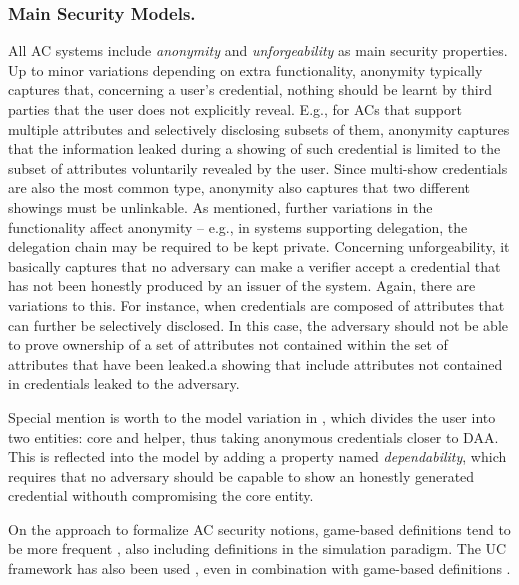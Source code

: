 \subsubsection{Main Security Models.}
%
All AC systems include \emph{anonymity} and \emph{unforgeability} as main
security properties. Up to minor variations depending on extra functionality,
anonymity typically captures that, concerning a user's credential, nothing
should be learnt by third parties that the user does not explicitly reveal.
E.g., for ACs that support multiple attributes and selectively disclosing
subsets of them, anonymity captures that the information leaked during a showing
of such credential is limited to the subset of attributes voluntarily revealed
by the user. Since multi-show credentials are also the most common type,
anonymity also captures that two different showings must be unlinkable.
As mentioned, further variations in the functionality affect anonymity --
e.g., in systems supporting delegation, the delegation chain may be required
to be kept private.
% 
Concerning unforgeability, it basically captures that no adversary can make
a verifier accept a credential that has not been honestly produced by an
issuer of the system. Again, there are variations to this. For instance, when
credentials are composed of attributes that can further be selectively
disclosed. In this case, the adversary should not be able to prove ownership
of a set of attributes not contained within the set of attributes that have
been leaked.a showing that include attributes not contained in credentials leaked to the
adversary.

Special mention is worth to the model variation in \cite{hs20}, which divides
the user into two entities: core and helper, thus taking anonymous credentials
closer to DAA. This is reflected into the model by adding a property named
\emph{dependability}, which requires that no adversary should be capable to
show an honestly generated credential withouth compromising the core entity.

On the approach to formalize AC security notions, game-based definitions tend
to be more frequent \needcite, also including definitions in the simulation
paradigm. The UC framework has also been used \needcite, even in combination
with game-based definitions \needcite.

